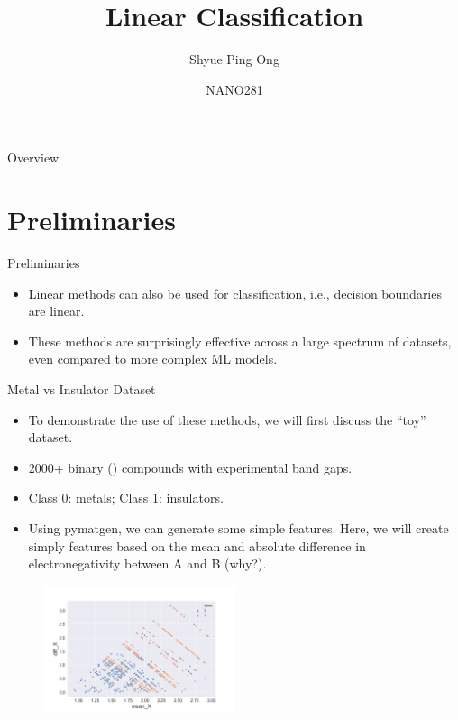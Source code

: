 \documentclass[aspectratio=169]{beamer}
\title[Linear Classification]{Linear Classification}
\author{Shyue Ping Ong}
\institute[UCSD]{University of California, San Diego\\
\medskip
}
\date{NANO281} %
\begin{document}
\begin{frame}
    \titlepage %
\end{frame}


\begin{frame}{Overview}
    \tableofcontents
\end{frame}


\section{Preliminaries}

\begin{frame}{Preliminaries}
    \begin{itemize}
        \item Linear methods can also be used for classification, i.e., decision boundaries are linear.
        \item These methods are surprisingly effective across a large spectrum of datasets, even compared to more complex ML models.
    \end{itemize}
\end{frame}


\begin{frame}{Metal vs Insulator Dataset}
    \begin{itemize}
        \item To demonstrate the use of these methods, we will first discuss the ``toy'' dataset.
        \item 2000+ binary () compounds with experimental band gaps.
        \item Class 0: metals; Class 1: insulators.
        \item Using pymatgen, we can generate some simple features. Here, we will create simply features based on the mean and absolute difference in electronegativity between A and B (why?).
    \end{itemize}
    \begin{figure}
        \centering
        \includegraphics[width=0.5\textwidth]{figures/electronnegativity_bandgap.png}
    \end{figure}
\end{frame}
\end{document}
